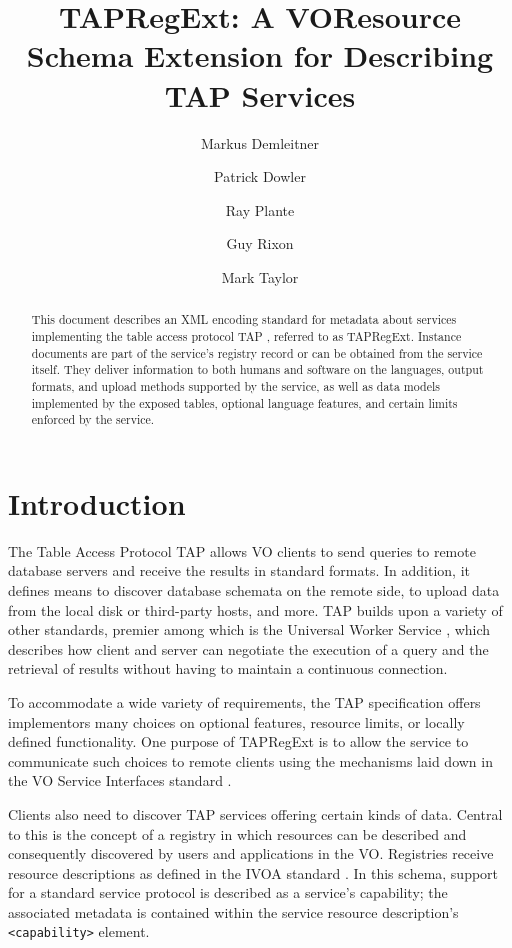 \documentclass{ivoa}
\author[http://www.ivoa.net/cgi-bin/twiki/bin/view/IVOA/MarkusDemleitner]{Markus
Demleitner}
\author[http://www.ivoa.net/cgi-bin/twiki/bin/view/IVOA/PatrickDowler]{Patrick
Dowler}
\author[http://www.ivoa.net/cgi-bin/twiki/bin/view/IVOA/RayPlante]{Ray
Plante}
\author[http://www.ivoa.net/cgi-bin/twiki/bin/view/IVOA/GuyRixon]{Guy
Rixon}
\author[http://www.ivoa.net/cgi-bin/twiki/bin/view/IVOA/MarkTaylor]{Mark
Taylor}
\title{TAPRegExt: A VOResource Schema Extension for Describing TAP Services}
\begin{document}
\begin{abstract}
This document describes an XML encoding standard for metadata about
services implementing the table access protocol TAP \citep{2019ivoa.spec.0927D},
referred to as TAPRegExt.  Instance documents are
part of the service's registry record or can be obtained from the service
itself.  They deliver information to both humans and software on the languages,
output formats, and upload methods supported by the service, as well as data
models implemented by the exposed tables, optional language features,
and certain limits enforced by the service.
\end{abstract}


\section{Introduction}

\label{introduction}

The Table Access Protocol TAP \citep{2019ivoa.spec.0927D} allows
VO clients to send queries to remote database servers and receive the
results in standard formats.  In addition, it defines means to discover
database schemata on the remote side, to upload data from the local disk
or third-party hosts, and more.  TAP builds upon a variety of other
standards, premier among which is the Universal Worker Service 
\citep{2016ivoa.spec.1024H}, which describes how client and server
can negotiate the execution of a query and the retrieval of results
without having to maintain a continuous connection.

To accommodate a wide variety of requirements, the TAP specification
offers implementors many choices on optional features, resource limits, or
locally defined functionality.  One purpose of TAPRegExt is to allow the
service to communicate such choices to remote clients using the mechanisms
laid down in the VO Service Interfaces standard
\citep{2017ivoa.spec.0524G}.

Clients also need to discover TAP services offering certain kinds of data.
Central to this is the concept of a registry in which resources can be
described and consequently discovered by users and applications in the VO.
Registries receive resource descriptions as defined in the IVOA standard 
\citep{2018ivoa.spec.0625P}. In this schema, support for 
a standard service protocol is described as a service's capability; the
associated metadata is contained within the service resource description's
\texttt{<capability>} element.
\end{document}
